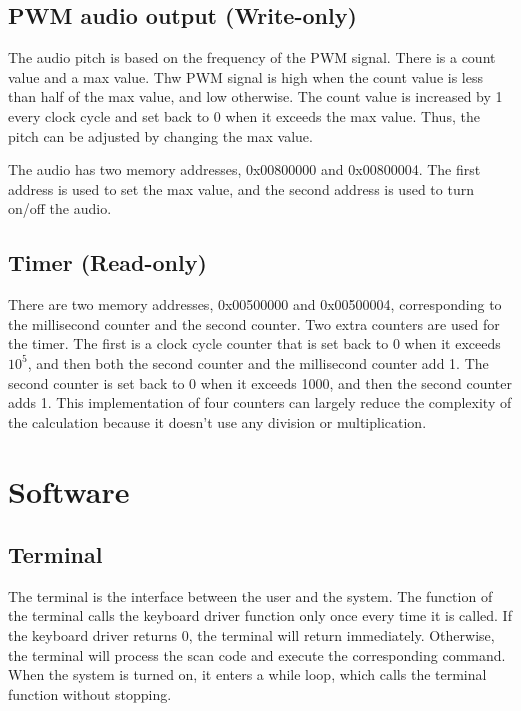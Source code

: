 \documentclass[12pt, a4paper, oneside]{article}
\begin{document}
\subsection{PWM audio output (Write-only)}
The audio pitch is based on the frequency of the PWM signal. There is a count value and a max value. Thw PWM signal is high when the count value is less than half of the max value, and low otherwise. The count value is increased by 1 every clock cycle and set back to 0 when it exceeds the max value. Thus, the pitch can be adjusted by changing the max value.

The audio has two memory addresses, 0x00800000 and 0x00800004. The first address is used to set the max value, and the second address is used to turn on/off the audio.

\subsection{Timer (Read-only)}
There are two memory addresses, 0x00500000 and 0x00500004, corresponding to the millisecond counter and the second counter. Two extra counters are used for the timer. The first is a clock cycle counter that is set back to 0 when it exceeds $10^5$, and then both the second counter and the millisecond counter add 1. The second counter is set back to 0 when it exceeds 1000, and then the second counter adds 1. This implementation of four counters can largely reduce the complexity of the calculation because it doesn't use any division or multiplication.

\section{Software}
\subsection{Terminal}
The terminal is the interface between the user and the system. The function of the terminal calls the keyboard driver function only once every time it is called. If the keyboard driver returns 0, the terminal will return immediately. Otherwise, the terminal will process the scan code and execute the corresponding command. When the system is turned on, it enters a while loop, which calls the terminal function without stopping.
\end{document}
